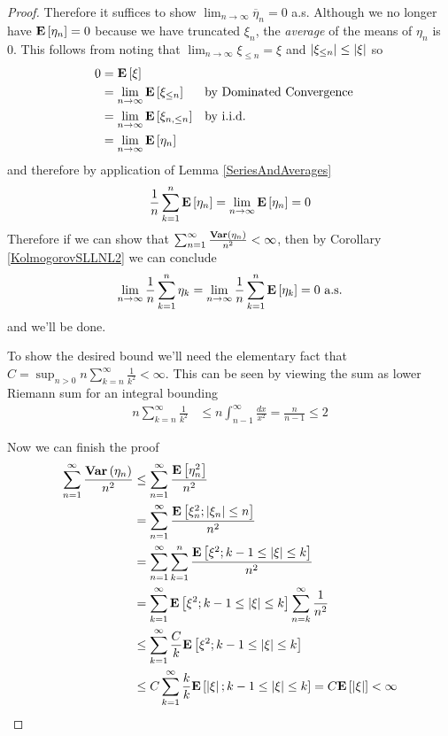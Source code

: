 \begin{proof}
Therefore it suffices to show $\lim_{n \to \infty} \overline{\eta}_n =
0$ a.s.  Although we no longer have $\textbf{E}\left[\eta_n\right] = 0$ because
we have truncated $\xi_n$, the \emph{average} of the means of $\eta_n$
is 0.  This follows from noting that $\lim_{n \to \infty} \xi_{ \leq n} =
\xi$ and $\left \vert \xi_{\leq n} \right \vert \leq \left \vert \xi \right \vert$ so 
\begin{align*}
0 &=\textbf{E}\left[\xi\right] \\
&= \lim_{n \to \infty}\textbf{E}\left[\xi_{\leq
    n}\right] & & \text{by Dominated Convergence}\\
&= \lim_{n \to \infty}\textbf{E}\left[\xi_{n, \leq n}\right] & & \text{by i.i.d.} \\
&= \lim_{n \to \infty}\textbf{E}\left[\eta_n\right]
\end{align*}
and therefore by application of Lemma \ref{SeriesAndAverages}
\begin{align*}
\frac{1}{n} \sum_{k=1}^n \textbf{E}\left[\eta_n\right] &= \lim_{n \to \infty}\textbf{E}\left[\eta_n\right]=0\\
\end{align*}
Therefore if we can show that $\sum_{n=1}^\infty
\frac{\textbf{Var} \left (\eta_n \right )}{n^2} <\infty$, then by Corollary
\ref{KolmogorovSLLNL2} we can conclude
\begin{align*}
\lim_{n \to \infty} \frac{1}{n} \sum_{k=1}^n \eta_k = \lim_{n \to
  \infty} \frac{1}{n} \sum_{k=1}^n \textbf{E}\left[\eta_k\right] = 0 \text { a.s.}
\end{align*}
and we'll be done.

To show the desired bound we'll need the elementary fact that $C =
\sup_{n>0} n \sum_{k=n}^\infty \frac{1}{k^2} < \infty$.  This can be
seen by viewing the sum as lower Riemann sum for an integral bounding
\begin{align*}
n \sum_{k=n}^\infty \frac{1}{k^2} &\leq n \int_{n-1}^\infty \frac{dx}{x^2}
= \frac{n}{n-1}  \leq 2
\end{align*}

Now we can finish the proof
\begin{align*}
\sum_{n=1}^\infty \frac{\textbf{Var} \left (\eta_n \right )}{n^2} &\leq
\sum_{n=1}^\infty\frac{\textbf{E}\left[\eta_n^2\right]}{n^2}  \\
&= \sum_{n=1}^\infty\frac{\textbf{E}\left[\xi_n^2;\left \vert \xi_n \right \vert \leq n\right]}{n^2} \\
&= \sum_{n=1}^\infty \sum_{k=1}^n \frac{\textbf{E}\left[\xi^2;k-1 \leq \left \vert \xi \right \vert \leq k\right]}{n^2} \\
&= \sum_{k=1}^\infty \textbf{E}\left[\xi^2;k-1 \leq \left \vert \xi \right \vert
    \leq k\right]\sum_{n=k}^\infty \frac{1}{n^2} \\
&\leq  \sum_{k=1}^\infty \frac{C}{k}\textbf{E}\left[\xi^2;k-1 \leq
  \left \vert \xi \right \vert\leq k\right] \\
&\leq  C\sum_{k=1}^\infty \frac{k}{k}\textbf{E}\left[\left \vert \xi \right \vert;k-1 \leq
  \left \vert \xi \right \vert\leq k\right] = C \textbf{E}\left[\left \vert \xi \right \vert\right] < \infty
\end{align*}


\end{proof}
